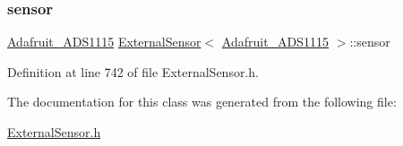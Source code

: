 \subsubsection{\texorpdfstring{sensor}{sensor}}
{\footnotesize\ttfamily \hyperlink{class_adafruit___a_d_s1115}{Adafruit\+\_\+\+A\+D\+S1115} \hyperlink{class_external_sensor}{External\+Sensor}$<$ \hyperlink{class_adafruit___a_d_s1115}{Adafruit\+\_\+\+A\+D\+S1115} $>$\+::sensor\hspace{0.3cm}{\ttfamily [private]}}



Definition at line 742 of file External\+Sensor.\+h.



The documentation for this class was generated from the following file\+:\begin{DoxyCompactItemize}
\item 
\hyperlink{_external_sensor_8h}{External\+Sensor.\+h}\end{DoxyCompactItemize}
